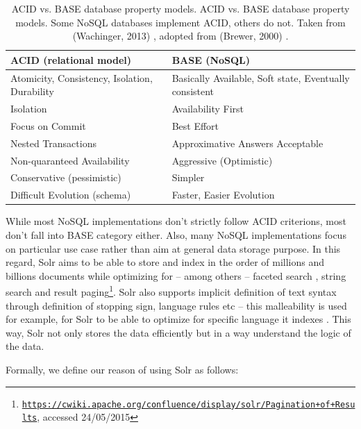 \begin{table}[htbp]
\caption{ACID vs. BASE database property models. ACID vs. BASE database property models. Some NoSQL databases implement ACID, others do not. Taken from (Wachinger, 2013) \citep{wachinger2013next}, adopted from (Brewer, 2000) \citep{brewer2000towards}.}
\begin{tabularx}{\textwidth}{ | l | X | }
  \hline
  ACID (relational model) & BASE (NoSQL) \\
  \hline
  Atomicity, Consistency, Isolation, Durability & Basically Available, Soft state, Eventually consistent \\
  Isolation & Availability First \\
  Focus on Commit & Best Effort \\
  Nested Transactions & Approximative Answers Acceptable \\
  Non-quaranteed Availability & Aggressive (Optimistic) \\
  Conservative (pessimistic) & Simpler \\
  Difficult Evolution (schema) & Faster, Easier Evolution \\
  \hline
\end{tabularx}
  \label{fig:ACIDvsBASE}
\end{table}

While most NoSQL implementations don't strictly follow ACID criterions, most don't fall into BASE category either. Also, many NoSQL implementations focus on particular use case rather than aim at general data storage purpose. In this regard, Solr aims to be able to store and index in the order of millions and billions documents while optimizing for -- among others -- faceted search \citep{tunkelang2009faceted}, string search and result paging\footnote{\href{https://cwiki.apache.org/confluence/display/solr/Pagination+of+Results}{\texttt{https://cwiki.apache.org/confluence/display/solr/Pagination+of+Results}}, accessed 24/05/2015}. Solr also supports implicit definition of text syntax through definition of stopping sign, language rules etc -- this malleability is used for example, for Solr to be able to optimize for specific language it indexes \citep{grainger2014solr}. This way, Solr not only stores the data efficiently but in a way understand the logic of the data.

Formally, we define our reason of using Solr as follows:

